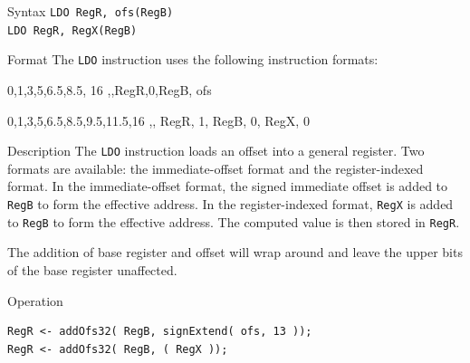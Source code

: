 %
%
\pagebreak
{}

\begin{iPageDescEntry}{Syntax}
\texttt{LDO RegR, ofs(RegB)} \\
\texttt{LDO RegR, RegX(RegB)}
\end{iPageDescEntry}

\begin{iPageDescEntry}{Format}
The \texttt{LDO} instruction uses the following instruction formats: \\

\begin{flushleft}
\drawInstrFormat
    {0,1,3,5,6.5,8.5, 16}
    {\OpCodeGrpALU,\OpCodeLDO,RegR,0,RegB, ofs}
\end{flushleft}

\begin{flushleft}
    \drawInstrFormat
        {0,1,3,5,6.5,8.5,9.5,11.5,16}
        {\OpCodeGrpALU,\OpCodeLDO, RegR, 1, RegB, 0, RegX, 0}
    \end{flushleft}
    
\end{iPageDescEntry}

\begin{iPageDescEntry}{Description}
The \texttt{LDO} instruction loads an offset into a general register. Two formats are available: the immediate-offset format and the register-indexed format. In the immediate-offset format, the signed immediate offset is added to \texttt{RegB} to form the effective address. In the register-indexed format, \texttt{RegX} is added to \texttt{RegB} to form the effective address. The computed value is then stored in \texttt{RegR}.

The addition of base register and offset will wrap around and leave the upper bits of the base register unaffected.

\end{iPageDescEntry}

\begin{iPageDescOpEntry}{Operation}
\begin{lstlisting}[style=iPageOpStyle]
RegR <- addOfs32( RegB, signExtend( ofs, 13 ));
RegR <- addOfs32( RegB, ( RegX ));
\end{lstlisting}
\end{iPageDescOpEntry}

